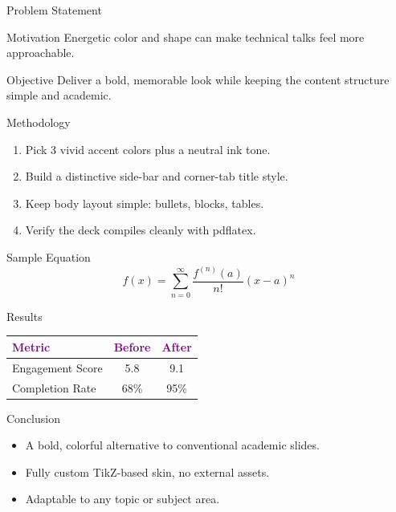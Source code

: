 \documentclass[aspectratio=169]{beamer}
\begin{document}
\begin{frame}{Problem Statement}
\begin{block}{Motivation}
Energetic color and shape can make technical talks feel more approachable.
\end{block}
\begin{block}{Objective}
Deliver a bold, memorable look while keeping the content structure simple and academic.
\end{block}
\end{frame}

\begin{frame}{Methodology}
\begin{enumerate}
  \item Pick 3 vivid accent colors plus a neutral ink tone.
  \item Build a distinctive side-bar and corner-tab title style.
  \item Keep body layout simple: bullets, blocks, tables.
  \item Verify the deck compiles cleanly with pdflatex.
\end{enumerate}
\end{frame}

\begin{frame}{Sample Equation}
\[
f(x) = \sum_{n=0}^{\infty} \frac{f^{(n)}(a)}{n!}(x-a)^n
\]
\end{frame}

\begin{frame}{Results}
\begin{table}
\centering
\begin{tabular}{lcc}
\toprule
\textcolor{purple}{\textbf{Metric}} & \textcolor{purple}{\textbf{Before}} & \textcolor{purple}{\textbf{After}} \\
\midrule
Engagement Score & 5.8 & 9.1 \\
Completion Rate & 68\% & 95\% \\
\bottomrule
\end{tabular}
\end{table}
\end{frame}

\begin{frame}{Conclusion}
\begin{itemize}
  \item A bold, colorful alternative to conventional academic slides.
  \item Fully custom TikZ-based skin, no external assets.
  \item Adaptable to any topic or subject area.
\end{itemize}
\end{frame}

\begin{frame}[plain]
\end{frame}
\end{document}

